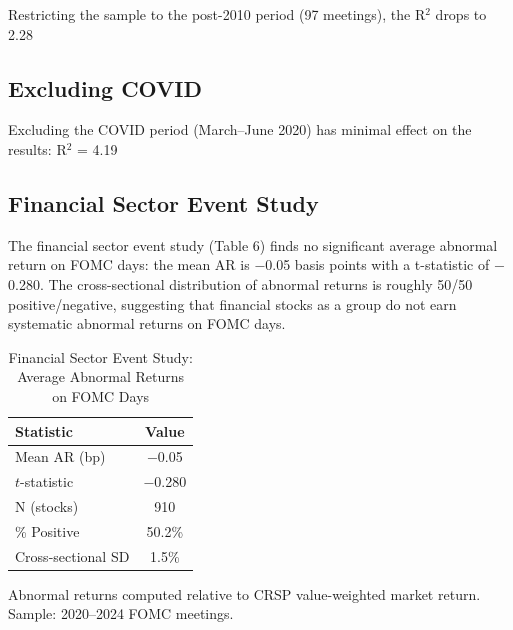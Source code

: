 \documentclass[12pt]{article}
\begin{document}
Restricting the sample to the post-2010 period (97 meetings), the R$^2$ drops to 2.28%

\subsection{Excluding COVID}

Excluding the COVID period (March–June 2020) has minimal effect on the results: R$^2$ = 4.19%

\subsection{Financial Sector Event Study}

The financial sector event study (Table 6) finds no significant average abnormal return on FOMC days: the mean AR is $-$0.05 basis points with a t-statistic of $-$0.280. The cross-sectional distribution of abnormal returns is roughly 50/50 positive/negative, suggesting that financial stocks as a group do not earn systematic abnormal returns on FOMC days.


\begin{table}[htbp]
\centering
\caption{Financial Sector Event Study: Average Abnormal Returns on FOMC Days}
\label{tab:event}
\begin{tabular}{lc}
\toprule
Statistic & Value \\
\midrule
Mean AR (bp) & $-$0.05 \\
$t$-statistic & $-$0.280 \\
N (stocks) & 910 \\
\% Positive & 50.2\% \\
Cross-sectional SD & 1.5\% \\
\bottomrule
\end{tabular}
\footnotesize{Abnormal returns computed relative to CRSP value-weighted market return. Sample: 2020--2024 FOMC meetings.}
\end{table}
\end{document}
